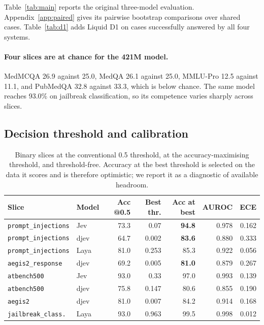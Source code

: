 Table~\ref{tab:main} reports the original three-model evaluation. Appendix~\ref{app:paired} gives its pairwise bootstrap comparisons over shared cases. Table~\ref{tab:d1} adds Liquid D1 on cases successfully answered by all four systems.



\paragraph{Four slices are at chance for the 421M model.} MedMCQA 26.9 against 25.0, MedQA 26.1 against 25.0, MMLU-Pro 12.5 against 11.1, and PubMedQA 32.8 against 33.3, which is below chance. The same model reaches 93.0\% on jailbreak classification, so its competence varies sharply across slices.

\subsection{Decision threshold and calibration}
\label{sec:threshold}

\begin{table}[t]
\centering
\caption{Binary slices at the conventional 0.5 threshold, at the accuracy-maximising threshold, and threshold-free. Accuracy at the best threshold is selected on the data it scores and is therefore optimistic; we report it as a diagnostic of available headroom.}
\label{tab:threshold}
\small
\begin{tabular}{llrrrrr}
\toprule
Slice & Model & Acc @0.5 & Best thr. & Acc at best & AUROC & ECE \\
\midrule
\texttt{prompt\_injections} & Jev  & 73.3 & 0.07  & \textbf{94.8} & 0.978 & 0.162 \\
\texttt{prompt\_injections} & djev & 64.7 & 0.002 & \textbf{83.6} & 0.880 & 0.333 \\
\texttt{prompt\_injections} & Laya & 81.0 & 0.253 & 85.3 & 0.922 & 0.056 \\
\texttt{aegis2\_response}   & djev & 69.2 & 0.005 & \textbf{81.0} & 0.879 & 0.267 \\
\texttt{atbench500}         & Jev  & 93.0 & 0.33  & 97.0 & 0.993 & 0.139 \\
\texttt{atbench500}         & djev & 75.8 & 0.147 & 80.6 & 0.855 & 0.190 \\
\texttt{aegis2}             & djev & 81.0 & 0.007 & 84.2 & 0.914 & 0.168 \\
\texttt{jailbreak\_class.}  & Laya & 93.0 & 0.963 & 99.5 & 0.998 & 0.012 \\
\bottomrule
\end{tabular}
\end{table}

